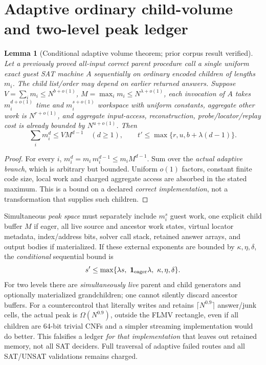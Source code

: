 \documentclass[11pt]{article}
\newtheorem{lemma}[theorem]{Lemma}
\begin{document}
\section{Adaptive ordinary child-volume and two-level peak ledger}
\begin{lemma}[Conditional adaptive volume theorem; prior corpus result verified]\label{lem:volume}
Let a \emph{previously proved all-input correct} parent procedure call a single uniform exact guest SAT machine $A$ sequentially on ordinary encoded children of lengths $m_i$. The child list/order may depend on earlier returned answers. Suppose $V=\sum_i m_i\le N^{b+o(1)}$, $M=\max_i m_i\le N^{\lambda+o(1)}$, each invocation of $A$ takes $m_i^{d+o(1)}$ time and $m_i^{s+o(1)}$ workspace with uniform constants, aggregate other work is $N^{r+o(1)}$, and aggregate input-access, reconstruction, probe/locator/replay cost is \emph{already bounded} by $N^{u+o(1)}$. Then
\[
\sum_i m_i^d\le VM^{d-1}\quad(d\ge1),\qquad
t'\le\max\{r,u,b+\lambda(d-1)\}.
\]
\end{lemma}
\begin{proof}
For every $i$, $m_i^d=m_i\,m_i^{d-1}\le m_iM^{d-1}$. Sum over the \emph{actual adaptive branch}, which is arbitrary but bounded. Uniform $o(1)$ factors, constant finite code size, local work and charged aggregate access are absorbed in the stated maximum. This is a bound on a declared \emph{correct implementation}, not a transformation that supplies such children.
\end{proof}
Simultaneous \emph{peak space} must separately include $m_i^s$ guest work, one explicit child buffer $M$ if eager, all live source and ancestor work states, virtual locator metadata, index/address bits, solver call stack, retained answer arrays, and output bodies if materialized. If these external exponents are bounded by $\kappa,\eta,\delta$, the \emph{conditional} sequential bound is
\[
s'\le\max\{\lambda s,\ \mathbf1_{\rm eager}\lambda,\ \kappa,\eta,\delta\}.
\]
For two levels there are \emph{simultaneously live} parent and child generators and optionally materialized grandchildren; one cannot silently discard ancestor buffers. For a countercontrol that literally writes and retains $\lceil N^{0.9}\rceil$ answer/junk cells, the actual peak is $\Omega(N^{0.9})$, outside the FLMV rectangle, even if all children are 64-bit trivial CNFs and a simpler streaming implementation would do better. This falsifies a ledger \emph{for that implementation} that leaves out retained memory, not all SAT deciders. Full traversal of adaptive failed routes and all SAT/UNSAT validations remains charged.
\end{document}
